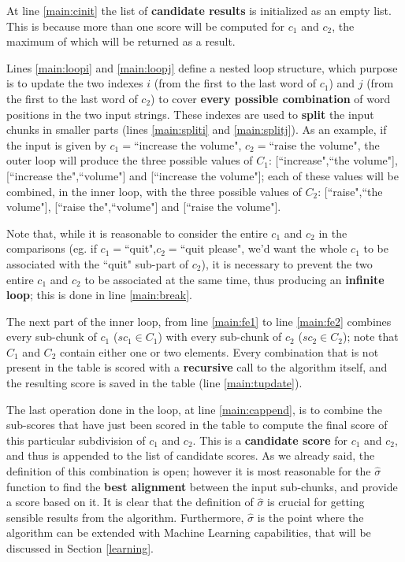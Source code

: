 At line \ref{main:cinit} the list of \textbf{candidate results} is initialized as an empty list. This is because more than one score will be computed for $c_1$ and $c_2$, the maximum of which will be returned as a result.

Lines \ref{main:loopi} and \ref{main:loopj} define a nested loop structure, which purpose is to update the two indexes $i$ (from the first to the last word of $c_1$) and $j$ (from the first to the last word of $c_2$) to cover \textbf{every possible combination} of word positions in the two input strings. These indexes are used to \textbf{split} the input chunks in smaller parts (lines \ref{main:spliti} and \ref{main:splitj}). As an example, if the input is given by $c_1=$``increase the volume", $c_2=$``raise the volume", the outer loop will produce the three possible values of $C_1$: [``increase",``the volume"], [``increase the",``volume"] and [``increase the volume"]; each of these values will be combined, in the inner loop, with the three possible values of $C_2$: [``raise",``the volume"], [``raise the",``volume"] and [``raise the volume"].

Note that, while it is reasonable to consider the entire $c_1$ and $c_2$ in the comparisons (eg. if $c_1=$``quit",$c_2=$``quit please", we'd want the whole $c_1$ to be associated with the ``quit" sub-part of $c_2$), it is necessary to prevent the two entire $c_1$ and $c_2$ to be associated at the same time, thus producing an \textbf{infinite loop}; this is done in line \ref{main:break}.

The next part of the inner loop, from line \ref{main:fe1} to line \ref{main:fe2} combines every sub-chunk of $c_1$ ($sc_1 \in C_1$) with every sub-chunk of $c_2$ ($sc_2 \in C_2$); note that $C_1$ and $C_2$ contain either one or two elements. Every combination that is not present in the table is scored with a \textbf{recursive} call to the algorithm itself, and the resulting score is saved in the table (line \ref{main:tupdate}).

The last operation done in the loop, at line \ref{main:cappend}, is to combine the sub-scores that have just been scored in the table to compute the final score of this particular subdivision of $c_1$ and $c_2$. This is a \textbf{candidate score} for $c_1$ and $c_2$, and thus is appended to the list of candidate scores. As we already said, the definition of this combination is open; however it is most reasonable for the $\hat{\sigma}$ function to find the \textbf{best alignment} between the input sub-chunks, and provide a score based on it. It is clear that the definition of $\hat{\sigma}$ is crucial for getting sensible results from the algorithm. Furthermore, $\hat{\sigma}$ is the point where the algorithm can be extended with Machine Learning capabilities, that will be discussed in Section \ref{learning}.

